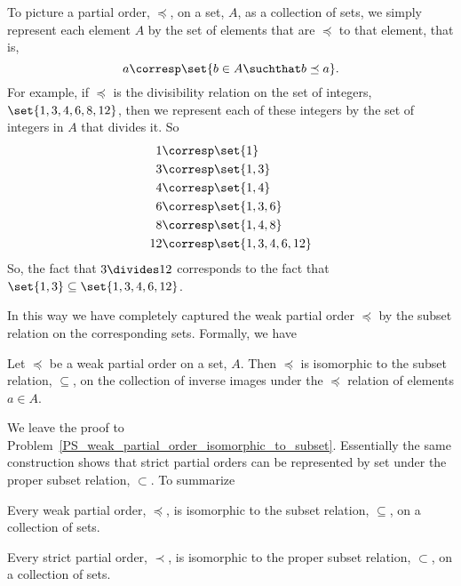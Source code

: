 To picture a partial order, $\preceq$, on a set, $A$, as a collection of
sets, we simply represent each element $A$ by the set of elements
that are $\preceq$ to that element, that is,
\[
a \corresp \set{b \in A \suchthat b \preceq a}.
\]
For example, if $\preceq$ is the divisibility relation on the set of
integers, $\set{1,3,4,6,8,12}$, then we represent each of these integers
by the set of integers in $A$ that divides it.  So
\begin{align*}
1 & \corresp \set{1}\\
3 & \corresp \set{1,3}\\
4 & \corresp \set{1,4}\\
6 & \corresp \set{1,3,6}\\
8 & \corresp \set{1,4,8}\\
12 & \corresp \set{1,3,4,6, 12}
\end{align*}
So, the fact that $3 \divides 12$ corresponds to the fact that $\set{1,3}
\subseteq \set{1,3,4,6, 12}$.

In this way we have completely captured the weak partial order $\preceq$ by the
subset relation on the corresponding sets.  Formally, we have
\begin{lemma}\label{rgb}
  Let $\preceq$ be a weak partial order on a set, $A$.  Then $\preceq$
  is isomorphic to the subset relation, $\subseteq$, on the collection
  of inverse images under the $\preceq$ relation of elements $a \in
  A$.
\end{lemma}
We leave the proof to
Problem~\ref{PS_weak_partial_order_isomorphic_to_subset}.  Essentially
the same construction shows that strict partial orders can be
represented by set under the proper subset relation, $\subset$.
To summarize
\begin{theorem}
  Every weak partial order, $\preceq$, is isomorphic to the subset
  relation, $\subseteq$, on a collection of sets.

  Every strict partial order, $\prec$, is isomorphic to the proper
  subset relation, $\subset$, on a collection of sets.
\end{theorem}

\begin{problems}
\classproblems
{}

\homeworkproblems
{}
\end{problems}


